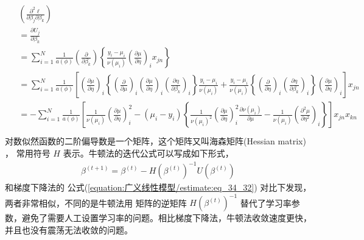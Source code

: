 \documentclass[letterpaper,10pt,english]{sphinxmanual}
\begin{document}
\begin{align}\label{equation:广义线性模型/estimate:eq_34_36}\!\begin{aligned}
&\left (\frac{\partial^2 \ell }{\partial \beta_j \partial \beta_k} \right )\\
&= \frac{\partial U_j}{\partial \beta_k}\\
&=
\sum_{i=1}^N \frac{1}{a(\phi)} \left (  \frac{\partial}{\partial \beta_k}   \right )
\left \{ \frac{y_i-\mu_i}{\nu(\mu_i)} \left ( \frac{\partial \mu}{\partial \eta} \right)_i x_{jn} \right \}\\
&= \sum_{i=1}^N \frac{1}{a(\phi)} \left [
    \left ( \frac{\partial \mu }{\partial \eta} \right )_i
    \left \{
        \left (  \frac{\partial  }{\partial \mu} \right )_i
        \left ( \frac{\partial \mu }{\partial \eta} \right )_i
        \left (  \frac{\partial \eta }{\partial \beta_k} \right )_i
    \right \} \frac{y_i-\mu_i}{\nu(\mu_i)}
    + \frac{y_i-\mu_i}{\nu(\mu_i)}
        \left \{
                \left ( \frac{\partial  }{\partial \eta} \right )_i
                \left ( \frac{\partial \eta }{\partial \beta_k} \right )_i
        \right \}
    \left ( \frac{\partial \mu }{\partial \eta} \right )_i
\right ] x_{jn}\\
&= -\sum_{i=1}^N \frac{1}{a(\phi)}
\left [
    \frac{1}{\nu(\mu_i)}  \left ( \frac{\partial \mu}{\partial \eta} \right )_i^2
    -(\mu_i-y_i)
        \left \{
            \frac{1}{\nu(\mu_i)^2}  \left ( \frac{\partial \mu }{\partial \eta} \right )_i^2 \frac{\partial \nu(\mu_i)}{\partial \mu}
            - \frac{1}{\nu(\mu_i)}  \left ( \frac{\partial^2 \mu}{\partial \eta^2} \right )_i
        \right \}
\right ] x_{jn}x_{kn}\\
\end{aligned}\end{align}
对数似然函数的二阶偏导数是一个矩阵，这个矩阵又叫海森矩阵(Hessian matrix) ，
常用符号 \(H\) 表示。牛顿法的迭代公式可以写成如下形式，
\begin{equation}\label{equation:广义线性模型/estimate:eq_34_35}
\begin{split} \beta^{(t+1)} = \beta^{(t)} - H(\beta^{(t)})^{-1} U(\beta^{(t)})\end{split}
\end{equation}
和梯度下降法的 公式(\ref{equation:广义线性模型/estimate:eq_34_32}) 对比下发现，两者非常相似，不同的是牛顿法用  矩阵的逆矩阵 \(H(\beta^{(t)})^{-1}\)
替代了学习率参数，避免了需要人工设置学习率的问题。相比梯度下降法，牛顿法收敛速度更快，并且也没有震荡无法收敛的问题。
\end{document}
